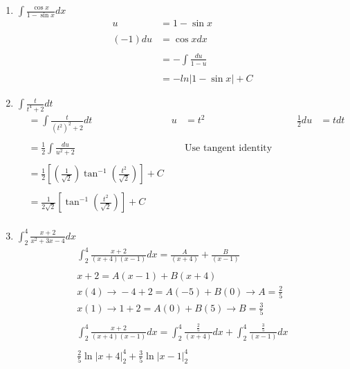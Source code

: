 \documentclass[12pt]{article}
\begin{document}
\begin{enumerate}
  \item $\int\frac{\cos{x}}{1-\sin{x}}dx$
        \begin{align*}
            u &= 1-\sin{x}\\\\
            (-1)du &= \cos{x} dx\\\\
            &=-\int\frac{du}{1-u}\\\\
            &=-ln|1-\sin{x}|+C
        \end{align*}
    \addtocounter{enumi}{3}\item $\int \frac{t}{t^4+2}dt$
        \begin{align*}
            &= \int \frac{t}{(t^2)^2+2}dt & u &= t^2 & \frac{1}{2}du &= tdt\\\\
            &= \frac{1}{2}\int \frac{du}{u^2+2} && \text{Use tangent identity here}\\\\
            &= \frac{1}{2}\left[\left(\frac{1}{\sqrt{2}}\right)\tan^{-1}\left(\frac{t^2}{\sqrt{2}}\right)\right] +C\\\\
            &= \frac{1}{2\sqrt{2}}\left[\tan^{-1}\left(\frac{t^2}{\sqrt{2}}\right)\right] + C \\
        \end{align*}
    \addtocounter{enumi}{3}\item $\int_{2}^{4}\frac{x+2}{x^2+3x-4}dx$
        \begin{align*}
             \int_{2}^{4}\frac{x+2}{(x+4)(x-1)}dx = \frac{A}{(x+4)}+\frac{B}{(x-1)}\\\\
             x+2 = A(x-1) + B(x+4)\\
             x(4) \xrightarrow{} -4+2=A(-5)+B(0) \xrightarrow{} A=\frac{2}{5}\\
             x(1) \xrightarrow{} 1+2= A(0)+B(5) \xrightarrow{} B=\frac{3}{5}\\\\
             \int_{2}^{4}\frac{x+2}{(x+4)(x-1)}dx = \int_{2}^{4}\frac{\frac{2}{5}}{(x+4)}dx+\int_{2}^{4}\frac{\frac{3}{5}}{(x-1)}dx\\\\
             \frac{2}{5}\ln{\Big|x+4\Big|}_2^4+\frac{3}{5}\ln{
             \Big|x-1\Big|}_2^4\\\\

\end{align*}
\end{enumerate}
\end{document}
